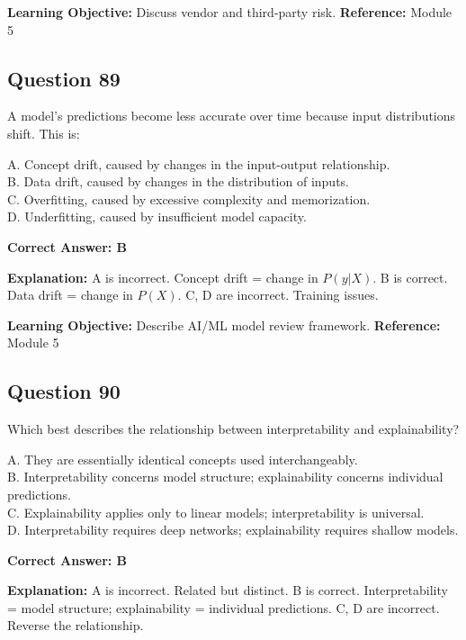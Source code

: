 \documentclass[11pt]{article}
\begin{document}
	\textbf{Learning Objective:} Discuss vendor and third-party risk.
	\textbf{Reference:} Module 5
	
	\subsection*{Question 89}
	A model's predictions become less accurate over time because input
	distributions shift. This is:
	
	A. Concept drift, caused by changes in the input-output relationship.\\
	B. Data drift, caused by changes in the distribution of inputs.\\
	C. Overfitting, caused by excessive complexity and memorization.\\
	D. Underfitting, caused by insufficient model capacity.
	
	\vspace{0.4em}
	\textbf{Correct Answer: B}
	
	\textbf{Explanation:}
	A is incorrect. Concept drift = change in $P(y|X)$.
	B is correct. Data drift = change in $P(X)$.
	C, D are incorrect. Training issues.
	
	\textbf{Learning Objective:} Describe AI/ML model review framework.
	\textbf{Reference:} Module 5
	
	\subsection*{Question 90}
	Which best describes the relationship between interpretability and
	explainability?
	
	A. They are essentially identical concepts used interchangeably.\\
	B. Interpretability concerns model structure; explainability concerns
	individual predictions.\\
	C. Explainability applies only to linear models; interpretability is
	universal.\\
	D. Interpretability requires deep networks; explainability requires
	shallow models.
	
	\vspace{0.4em}
	\textbf{Correct Answer: B}
	
	\textbf{Explanation:}
	A is incorrect. Related but distinct.
	B is correct. Interpretability = model structure; explainability =
	individual predictions.
	C, D are incorrect. Reverse the relationship.
	
\end{document}
